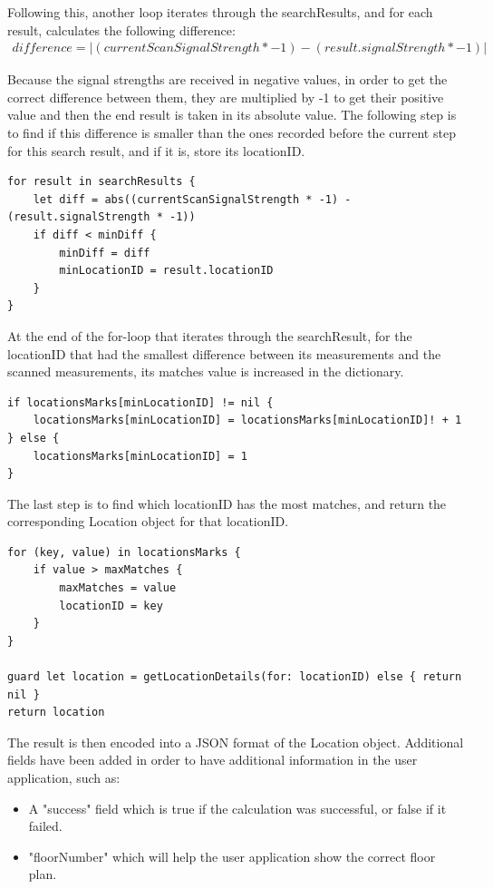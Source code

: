 Following this, another loop iterates through the searchResults, and for each result, calculates the following difference:
\begin{align}
    difference = |(currentScanSignalStrength * -1) - (result.signalStrength * -1)|
\end{align}

Because the signal strengths are received in negative values, in order to get the correct difference between them, they are multiplied by -1 to get their positive value and then the end result is taken in its absolute value. The following step is to find if this difference is smaller than the ones recorded before the current step for this search result, and if it is, store its locationID.

\begin{lstlisting}
for result in searchResults {
    let diff = abs((currentScanSignalStrength * -1) - (result.signalStrength * -1))
    if diff < minDiff {
        minDiff = diff
        minLocationID = result.locationID
    }
}
\end{lstlisting}

At the end of the for-loop that iterates through the searchResult, for the locationID that had the smallest difference between its measurements and the scanned measurements, its matches value is increased in the dictionary.

\begin{lstlisting}
if locationsMarks[minLocationID] != nil {
    locationsMarks[minLocationID] = locationsMarks[minLocationID]! + 1
} else {
    locationsMarks[minLocationID] = 1
}
\end{lstlisting}

The last step is to find which locationID has the most matches, and return the corresponding Location object for that locationID.

\begin{lstlisting}
for (key, value) in locationsMarks {
    if value > maxMatches {
        maxMatches = value
        locationID = key
    }
}

guard let location = getLocationDetails(for: locationID) else { return nil }
return location 
\end{lstlisting}

The result is then encoded into a JSON format of the Location object. Additional fields have been added in order to have additional information in the user application, such as:
\begin{itemize}
    \item A "success" field which is true if the calculation was successful, or false if it failed.
    \item "floorNumber" which will help the user application show the correct floor plan.
\end{itemize}

